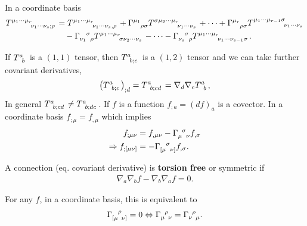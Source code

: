 
\begin{exercise}
    In a coordinate basis
    \begin{align}
        \tensor{T}{^{\mu_1 \cdots \mu_r}_{\nu_1 \cdots \nu_s ; \rho}} &= \tensor{T}{^{\mu_1 \cdots \mu_r}_{\nu_1 \cdots \nu_s,\rho}} + \tensor{\Gamma}{^{\mu_1}_{\rho \sigma}} \tensor{T}{^{\sigma \mu_2 \cdots \mu_r}_{\nu_1 \cdots \nu_s}} + \cdots + \tensor{\Gamma}{^{\mu_r}_{\rho \sigma}} \tensor{T}{^{\mu_1 \cdots \mu_{r-1} \sigma}_{\nu_1 \cdots \nu_s}} \\
        &\quad -\tensor{\Gamma}{_{\nu_1}^{\sigma}_\rho} \tensor{T}{^{\mu_1 \cdots \mu_r}_{\sigma \nu_2 \cdots \nu_s}} - \cdots - \tensor{\Gamma}{_{\nu_s}^{\sigma}_{\rho}} \tensor{T}{^{\mu_1 \cdots \mu_r}_{\nu_1 \cdots \nu_{s-1}\sigma}}
    .\end{align}
\end{exercise}

\begin{remark}
    If $\tensor{T}{^{a}_b}$ is a $\left( 1,1 \right) $ tensor, then $\tensor{T}{^{a}_{b;c}}$ is a $\left( 1,2 \right) $ tensor and we can take further covariant derivatives,
    \begin{align}
        \left( \tensor{T}{^{a}_{b;c}} \right)_{;d} = \tensor{T}{^{a}_{b;cd}} = \nabla_d \nabla_c \tensor{T}{^{a}_b}
    ,\end{align}
    In general $\tensor{T}{^{a}_{b;cd}} \neq \tensor{T}{^{a}_{b;dc}}$. If $f$ is a function $f_{;a} = \left( df \right)_a$ is a covector. In a coordinate basis $f_{;\mu} = f_{,\mu}$ which implies
    \begin{align}
        f_{;\mu \nu} &= f_{,\mu \nu} - \tensor{\Gamma}{_{\mu}^{\sigma}_{\nu}} f_{,\sigma} \\
        \implies f_{; \left[ \mu \nu \right] } &= - \tensor{\Gamma}{_{[\mu}^{\sigma}_{\nu]}} f_{,\sigma}
    .\end{align}
\end{remark}


\begin{definition}
    A connection (eq. covariant derivative) is \textbf{torsion free} or symmetric if
    \begin{align}
        \nabla_a \nabla_b f - \nabla_b \nabla_a f = 0
    .\end{align}

    For any $f$, in a coordinate basis, this is equivalent to
    \begin{align}
        \tensor{\Gamma}{_{[\mu}^{\rho}_{\nu]}} = 0 \iff \tensor{\Gamma}{_{\mu}^{\rho}_{\nu}} = \tensor{\Gamma}{_{\nu}^{\rho}_{\mu}}
    .\end{align}
\end{definition}

